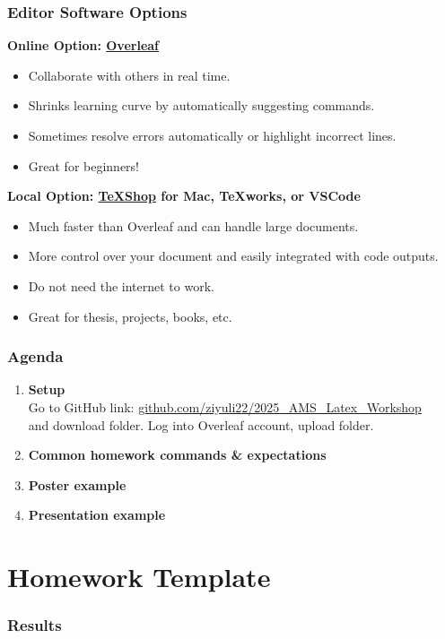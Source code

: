 \documentclass[serif,12pt, aspectratio=169]{beamer}
\begin{document}
\begin{frame}
	\frametitle{Editor Software Options}
	\pause
	\textbf{Online Option: \href{http://www.overleaf.com}{Overleaf}}
	\pause
	\begin{itemize}
		\item Collaborate with others in real time. 
		\pause
		\item Shrinks learning curve by automatically suggesting commands. 
		\pause
		\item Sometimes resolve errors automatically or highlight incorrect lines.
		\pause
		\item Great for beginners!
	\end{itemize}
	\pause
	\textbf{Local Option: \href{https://pages.uoregon.edu/koch/texshop/installingtexshop.html}{TeXShop} for Mac, TeXworks, or VSCode}
	\pause
	\begin{itemize}
		\item Much faster than Overleaf and can handle large documents. 
		\pause
		\item More control over your document and easily integrated with code outputs. 
		\pause
		\item Do not need the internet to work. 
		\pause
		\item Great for thesis, projects, books, etc. 
	\end{itemize}
\end{frame}


\begin{frame}
	\frametitle{Agenda}
	\pause
	\begin{enumerate}
		\item \textbf{Setup} \\
		Go to GitHub link: \url{github.com/ziyuli22/2025_AMS_Latex_Workshop} \\
		and download folder. Log into Overleaf account, upload folder. 
		\item \textbf{Common homework commands \& expectations}
		\item \textbf{Poster example}
		\item \textbf{Presentation example}
	\end{enumerate}
\end{frame}


\section{Homework Template}
\begin{frame}
	\frametitle{Results}
	
\end{frame}







\end{document}
